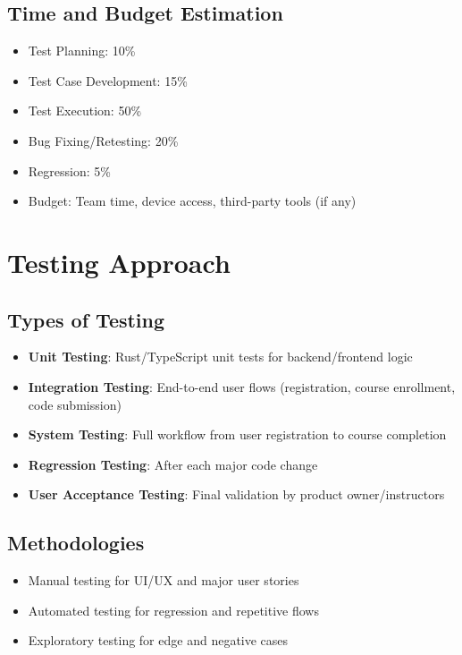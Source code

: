 \documentclass[a4paper,11pt]{scrartcl}
\begin{document}
\subsection{Time and Budget Estimation}
\begin{itemize}[leftmargin=*]
    \item Test Planning: 10\%
    \item Test Case Development: 15\%
    \item Test Execution: 50\%
    \item Bug Fixing/Retesting: 20\%
    \item Regression: 5\%
    \item Budget: Team time, device access, third-party tools (if any)
\end{itemize}

\section{Testing Approach}

\subsection{Types of Testing}
\begin{itemize}[leftmargin=*]
    \item \textbf{Unit Testing}: Rust/TypeScript unit tests for backend/frontend logic
    \item \textbf{Integration Testing}: End-to-end user flows (registration, course enrollment, code submission)
    \item \textbf{System Testing}: Full workflow from user registration to course completion
    \item \textbf{Regression Testing}: After each major code change
    \item \textbf{User Acceptance Testing}: Final validation by product owner/instructors
\end{itemize}

\subsection{Methodologies}
\begin{itemize}[leftmargin=*]
    \item Manual testing for UI/UX and major user stories
    \item Automated testing for regression and repetitive flows
    \item Exploratory testing for edge and negative cases
\end{itemize}
\end{document}
